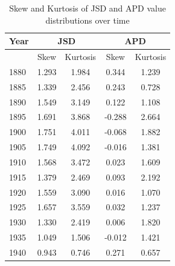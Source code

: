 \documentclass[10pt, a4paper]{article}
\begin{document}
\begin{table}[!h]
\label{SkewKurtosis_JSDandAPD}
\begin{center}
\begin{tabularx}{\columnwidth}{|X|c|c|c|c|}

      \hline
       Year&\multicolumn{2}{c}{JSD}&\multicolumn{2}{c}{APD}\\
       \hline
      &Skew&Kurtosis&Skew&Kurtosis\\
      \hline
      1880&1.293&1.984&0.344&1.239\\
      \hline
      1885&1.339&2.456&0.243&0.728\\
      \hline
      1890&1.549&3.149&0.122&1.108\\
      \hline
      1895&1.691&3.868&-0.288&2.664\\
      \hline
      1900&1.751&4.011&-0.068&1.882\\
      \hline
      1905&1.749&4.092&-0.016&1.381\\
      \hline
      1910&1.568&3.472&0.023&1.609\\
      \hline
      1915&1.379&2.469&0.093&2.192\\
      \hline
      1920&1.559&3.090&0.016&1.070\\
      \hline
      1925&1.657&3.559&0.032&1.237\\
      \hline
      1930&1.330&2.419&0.006&1.820\\
      \hline
      1935&1.049&1.506&-0.012&1.421\\
      \hline
      1940&0.943&0.746&0.271&0.657\\
      \hline

\end{tabularx}
\caption{Skew and Kurtosis of JSD and APD value distributions over time}
 \end{center}
\end{table}
\end{document}
